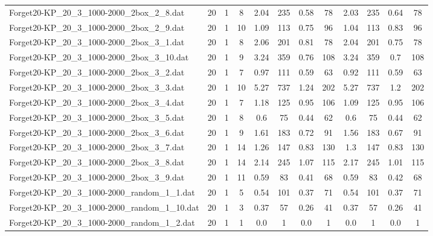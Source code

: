 \begin{sidewaystable}[!ht]
{\begin{tabular}{lccccccccccc}
Forget20-KP\_20\_3\_1000-2000\_2box\_2\_8.dat & 20 & 1 & 8 & 2.04 & 235 &  \textcolor{blue2}{0.58} & 78 & 2.03 & 235 & 0.64 & 78 \\
Forget20-KP\_20\_3\_1000-2000\_2box\_2\_9.dat & 20 & 1 & 10 & 1.09 & 113 &  \textcolor{blue2}{0.75} & 96 & 1.04 & 113 & 0.83 & 96 \\
Forget20-KP\_20\_3\_1000-2000\_2box\_3\_1.dat & 20 & 1 & 8 & 2.06 & 201 & 0.81 & 78 & 2.04 & 201 &  \textcolor{blue2}{0.75} & 78 \\
Forget20-KP\_20\_3\_1000-2000\_2box\_3\_10.dat & 20 & 1 & 9 & 3.24 & 359 & 0.76 & 108 & 3.24 & 359 &  \textcolor{blue2}{0.7} & 108 \\
Forget20-KP\_20\_3\_1000-2000\_2box\_3\_2.dat & 20 & 1 & 7 & 0.97 & 111 &  \textcolor{blue2}{0.59} & 63 & 0.92 & 111 &  \textcolor{blue2}{0.59} & 63 \\
Forget20-KP\_20\_3\_1000-2000\_2box\_3\_3.dat & 20 & 1 & 10 & 5.27 & 737 & 1.24 & 202 & 5.27 & 737 &  \textcolor{blue2}{1.2} & 202 \\
Forget20-KP\_20\_3\_1000-2000\_2box\_3\_4.dat & 20 & 1 & 7 & 1.18 & 125 &  \textcolor{blue2}{0.95} & 106 & 1.09 & 125 &  \textcolor{blue2}{0.95} & 106 \\
Forget20-KP\_20\_3\_1000-2000\_2box\_3\_5.dat & 20 & 1 & 8 & 0.6 & 75 &  \textcolor{blue2}{0.44} & 62 & 0.6 & 75 &  \textcolor{blue2}{0.44} & 62 \\
Forget20-KP\_20\_3\_1000-2000\_2box\_3\_6.dat & 20 & 1 & 9 & 1.61 & 183 & 0.72 & 91 & 1.56 & 183 &  \textcolor{blue2}{0.67} & 91 \\
Forget20-KP\_20\_3\_1000-2000\_2box\_3\_7.dat & 20 & 1 & 14 & 1.26 & 147 &  \textcolor{blue2}{0.83} & 130 & 1.3 & 147 &  \textcolor{blue2}{0.83} & 130 \\
Forget20-KP\_20\_3\_1000-2000\_2box\_3\_8.dat & 20 & 1 & 14 & 2.14 & 245 & 1.07 & 115 & 2.17 & 245 &  \textcolor{blue2}{1.01} & 115 \\
Forget20-KP\_20\_3\_1000-2000\_2box\_3\_9.dat & 20 & 1 & 11 & 0.59 & 83 &  \textcolor{blue2}{0.41} & 68 & 0.59 & 83 & 0.42 & 68 \\
Forget20-KP\_20\_3\_1000-2000\_random\_1\_1.dat & 20 & 1 & 5 & 0.54 & 101 &  \textcolor{blue2}{0.37} & 71 & 0.54 & 101 &  \textcolor{blue2}{0.37} & 71 \\
Forget20-KP\_20\_3\_1000-2000\_random\_1\_10.dat & 20 & 1 & 3 & 0.37 & 57 &  \textcolor{blue2}{0.26} & 41 & 0.37 & 57 &  \textcolor{blue2}{0.26} & 41 \\
Forget20-KP\_20\_3\_1000-2000\_random\_1\_2.dat & 20 & 1 & 1 &  \textcolor{blue2}{0.0} & 1 &  \textcolor{blue2}{0.0} & 1 &  \textcolor{blue2}{0.0} & 1 &  \textcolor{blue2}{0.0} & 1 \\

\end{tabular}}
\end{sidewaystable}
